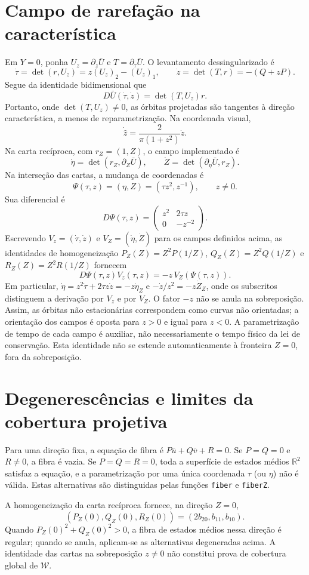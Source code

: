 \documentclass[11pt,a4paper]{article}
\begin{document}
\section{Campo de rarefação na característica}
Em $Y=0$, ponha $U_z=\partial_z\bar U$ e $T=\partial_\tau\bar U$. O levantamento dessingularizado é
\[
\boxed{\dot\tau=\det(r,U_z)=z(U_z)_2-(U_z)_1},\qquad
\boxed{\dot z=\det(T,r)=-(Q+zP)}.
\]
Segue da identidade bidimensional que
\[
D\bar U(\dot\tau,\dot z)=\det(T,U_z)r.
\]
Portanto, onde $\det(T,U_z)\ne0$, as órbitas projetadas são tangentes à direção característica, a menos de reparametrização. Na coordenada visual,
\[
\dot{\hat z}=\frac{2}{\pi(1+z^2)}\dot z.
\]
Na carta recíproca, com $r_Z=(1,Z)$, o campo implementado é
\[
\dot\eta=\det(r_Z,\partial_Z\bar U),\qquad
\dot Z=\det(\partial_\eta\bar U,r_Z).
\]
Na interseção das cartas, a mudança de coordenadas é
\[
\Psi(\tau,z)=(\eta,Z)=(\tau z^2,z^{-1}),\qquad z\ne0.
\]
Sua diferencial é
\[
D\Psi(\tau,z)=\begin{pmatrix}z^2&2\tau z\\0&-z^{-2}\end{pmatrix}.
\]
Escrevendo $V_z=(\dot\tau,\dot z)$ e $V_Z=(\dot\eta,\dot Z)$ para os campos definidos acima, as identidades de homogeneização
$P_Z(Z)=Z^2P(1/Z)$, $Q_Z(Z)=Z^2Q(1/Z)$ e $R_Z(Z)=Z^2R(1/Z)$ fornecem
\[
\boxed{D\Psi(\tau,z)V_z(\tau,z)=-z\,V_Z(\Psi(\tau,z)).}
\]
Em particular, $\dot\eta=z^2\dot\tau+2\tau z\dot z=-z\dot\eta_{Z}$ e $-\dot z/z^2=-z\dot Z_{Z}$, onde os subscritos distinguem a derivação por $V_z$ e por $V_Z$. O fator $-z$ não se anula na sobreposição. Assim, as órbitas não estacionárias correspondem como curvas não orientadas; a orientação dos campos é oposta para $z>0$ e igual para $z<0$. A parametrização de tempo de cada campo é auxiliar, não necessariamente o tempo físico da lei de conservação. Esta identidade não se estende automaticamente à fronteira $Z=0$, fora da sobreposição.
\section{Degenerescências e limites da cobertura projetiva}
Para uma direção fixa, a equação de fibra é $P\bar u+Q\bar v+R=0$.
Se $P=Q=0$ e $R\ne0$, a fibra é vazia. Se $P=Q=R=0$, toda a
superfície de estados médios $\mathbb R^2$ satisfaz a equação, e a
parametrização por uma única coordenada $\tau$ (ou $\eta$) não é válida.
Estas alternativas são distinguidas pelas funções \texttt{fiber} e
\texttt{fiberZ}.

A homogeneização da carta recíproca fornece, na direção $Z=0$,
\[
(P_Z(0),Q_Z(0),R_Z(0))=(2b_{20},b_{11},b_{10}).
\]
Quando $P_Z(0)^2+Q_Z(0)^2>0$, a fibra de estados médios nessa direção
é regular; quando se anula, aplicam-se as alternativas degeneradas acima.
A identidade das cartas na sobreposição $z\ne0$ não constitui prova
de cobertura global de $\mathcal W$.
\end{document}
